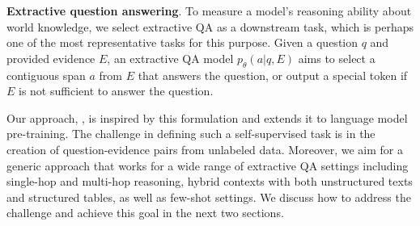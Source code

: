\documentclass[11pt]{article}
\newcommand{\hs}[1]{\textcolor{blue}{Huan: #1}}
\newcommand{\nop}[1]{}
\newcommand{\ours}[0]{\text{ReasonBERT}}
\begin{document}
\noindent \textbf{Extractive question answering}. To measure a model’s reasoning ability about world knowledge, we select extractive QA as a downstream task, which is perhaps one of the most representative tasks for this purpose. Given a question $q$ and provided evidence $E$, an extractive QA model $p_\theta(a|q,E)$ aims to select a contiguous span $a$ from $E$ that answers the question, or output a special token if $E$ is not sufficient to answer the question. 


Our approach, \ours, is inspired by this formulation and extends it to language model pre-training. The challenge in defining such a self-supervised task is in the creation of question-evidence pairs from unlabeled data. Moreover, we aim for a generic approach that works for a wide range of extractive QA settings including single-hop and multi-hop reasoning, hybrid contexts with both unstructured texts and structured tables, as well as few-shot settings. We discuss how to address the challenge and achieve this goal in the next two sections. 



\nop{
Earlier QA datasets like SQuAD mostly contain simple single-hop questions that use only a single context as evidence and do not require deep comprehension and reasoning. More recently, researchers have studied more challenging QA tasks, including multi-hop QA (where the model needs to first filter out irrelevant information from a set of contexts \hs{does our pre-training help this part?}, and then combine multiple disjoint pieces of evidence as $E$ to find the answer) and hybrid QA (where the evidence $E$ includes both unstructured text and structured tables). {These tasks require reasoning over multiple contexts and understanding long-range relations.} 

{Driven by this observation, we aim to improve such reasoning abilities during pre-training so that the pre-trained models can better serve these as well as other similar tasks. One essential challenge is creating a large set of query-evidence pairs for pre-training, which we will detail next.}
}
\end{document}
